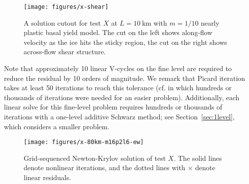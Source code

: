 \documentclass[3p]{elsarticle}
\begin{document}
\begin{figure}
  \texttt{[image: figures/x-shear]}
  \centering\caption{A solution cutout for test $X$ at $L=\SI{10}{\kilo\metre}$ with $m=1/10$ nearly plastic basal yield model.
    The cut on the left shows along-flow velocity as the ice hits the sticky region, the cut on the right shows across-flow shear structure.}\label{fig:xshear}
\end{figure}

Note that approximately 10 linear V-cycles on the fine level are required to reduce the residual by 10 orders of magnitude.
We remark that Picard iteration takes at least 50 iterations to reach this tolerance (cf. \cite{desmedt2010using} in which hundreds or thousands of iterations were needed for an easier problem).  Additionally, each linear solve for this fine-level problem requires hundreds or thousands of iterations with a one-level additive Schwarz method; see Section~\ref{sec:1level}, which considers a smaller problem.

\begin{figure}
  \texttt{[image: figures/x-80km-m16p2l6-ew]}
  \centering\caption{Grid-sequenced Newton-Krylov solution of test $X$.  The solid lines denote nonlinear iterations, and the dotted lines with $\times$ denote linear residuals.}\label{fig:xgridseq}
\end{figure}
\end{document}
